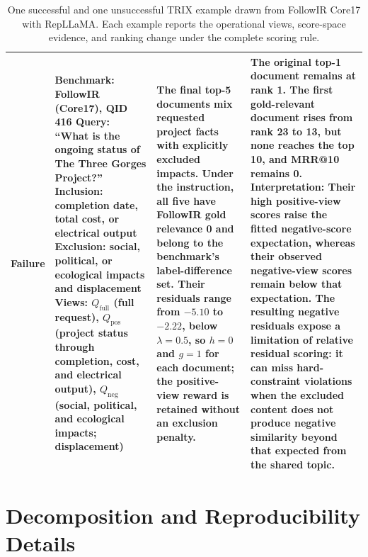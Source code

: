 \documentclass[letterpaper]{article}
\newcommand{\method}{\ifmmode \mathrm{TRIX}\else TRIX\xspace\fi}
\newcommand{\qbase}{Q_{\text{full}}}
\newcommand{\qpos}{Q_{\text{pos}}}
\newcommand{\qneg}{Q_{\text{neg}}}
\begin{document}
\begin{table}[t]
\begin{tabular}{p{}p{}p{}p{}}
Failure &
  Benchmark: FollowIR (Core17), QID 416
  \newline Query: ``What is the ongoing status of The Three Gorges Project?''
  \newline Inclusion: completion date, total cost, or electrical output
  \newline Exclusion: social, political, or ecological impacts and displacement
  \newline Views: $\qbase$ (full request), $\qpos$ (project status through
  completion, cost, and electrical output), $\qneg$ (social, political, and
  ecological impacts; displacement) &
  The final top-5 documents mix requested project facts with explicitly
  excluded impacts.  Under the instruction, all five have FollowIR
  gold relevance 0 and belong to the benchmark's label-difference set.  Their
  residuals range from $-5.10$ to $-2.22$, below $\lambda=0.5$, so $h=0$ and
  $g=1$ for each document; the positive-view reward is retained without an
  exclusion penalty. &
  The original top-1 document remains at rank 1.  The first gold-relevant
  document rises from rank 23 to 13, but none reaches the top 10, and MRR@10
  remains 0.
  \newline \textbf{Interpretation:} Their high positive-view scores raise the
  fitted negative-score expectation, whereas their observed negative-view
  scores remain below that expectation.  The resulting negative residuals
  expose a limitation of relative residual scoring: it can miss hard-constraint
  violations when the excluded content does not produce negative similarity
  beyond that expected from the shared topic. \\
\bottomrule
\end{tabular}
\caption{One successful and one unsuccessful \method{} example drawn from
FollowIR Core17 with RepLLaMA.  Each example reports the operational views,
score-space evidence, and ranking change under the complete scoring rule.}
\label{tab:qualitative-cases}
\end{table}

\section{Decomposition and Reproducibility Details}
\label{app:implementation}
\end{document}
